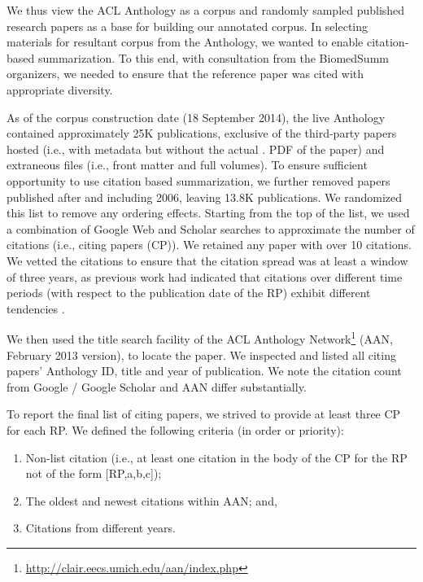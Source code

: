 \documentclass[11pt]{article}
\begin{document}
We thus view the ACL Anthology as a corpus and randomly sampled
published research papers as a base for building our annotated corpus.
In selecting materials for resultant corpus from the Anthology, we
wanted to enable citation-based summarization. To this end, with
consultation from the BiomedSumm organizers, we needed to ensure that
the reference paper was cited with appropriate diversity.

As of the corpus construction date (18 September 2014), the live
Anthology contained approximately 25K publications, exclusive of the
third-party papers hosted (i.e., with metadata but without the actual
. PDF of the paper) and extraneous files (i.e., front matter and full
volumes).  To ensure sufficient opportunity to use citation based
summarization, we further removed papers published after and including
2006, leaving 13.8K publications.  We randomized this list to remove
any ordering effects.  Starting from the top of the list, we used a
combination of Google Web and Scholar searches to approximate the
number of citations (i.e., citing papers (CP)). We retained any paper
with over 10 citations.  We vetted the citations to ensure that the
citation spread was at least a window of three years, as previous work
had indicated that citations over different time periods (with respect
to the publication date of the RP) exhibit different tendencies
\cite{N13-1067}.

We then used the title search facility of the ACL Anthology
Network\footnote{\url{http://clair.eecs.umich.edu/aan/index.php}}
(AAN, February 2013 version), to locate the paper. We inspected and
listed all citing papers' Anthology ID, title and year of publication.
We note the citation count from Google / Google Scholar and AAN differ
substantially.

To report the final list of citing papers, we strived to provide at
least three CP for each RP. We defined the following
criteria (in order or priority):
\begin{enumerate}
\item Non-list citation (i.e., at least one citation in the body of
  the CP for the RP not of the form [RP,a,b,c]);
\vspace{-.3cm}
\item The oldest and newest
citations within AAN; and, 
\vspace{-.3cm}
\item Citations from different years. 
\end{enumerate}
\end{document}
